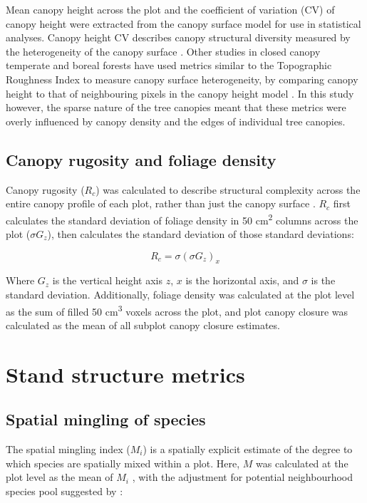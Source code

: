 \documentclass[11pt,a4paper]{article}
\begin{document}
Mean canopy height across the plot and the coefficient of variation (CV) of canopy height were extracted from the canopy surface model for use in statistical analyses. Canopy height CV describes canopy structural diversity measured by the heterogeneity of the canopy surface \citep{Parker2004}. Other studies in closed canopy temperate and boreal forests have used metrics similar to the Topographic Roughness Index to measure canopy surface heterogeneity, by comparing canopy height to that of neighbouring pixels in the canopy height model \citep{Weligepolage2012, HerreroHuerta2020}. In this study however, the sparse nature of the tree canopies meant that these metrics were overly influenced by canopy density and the edges of individual tree canopies. 

\subsection{Canopy rugosity and foliage density}

Canopy rugosity ($R_{c}$) was calculated to describe structural complexity across the entire canopy profile of each plot, rather than just the canopy surface \citep{Hardiman2011}. $R_{c}$ first calculates the standard deviation of foliage density in 50 cm\textsuperscript{2} columns across the plot ($\sigma{}G_{z}$), then calculates the standard deviation of those standard deviations: 

\begin{equation}
	R_{c} = \sigma{}(\sigma{}G_{z})_{x}
\end{equation}

Where $G_{z}$ is the vertical height axis $z$, $x$ is the horizontal axis, and $\sigma{}$ is the standard deviation. Additionally, foliage density was calculated at the plot level as the sum of filled 50 cm\textsuperscript{3} voxels across the plot, and plot canopy closure was calculated as the mean of all subplot canopy closure estimates. 

\section{Stand structure metrics}

\subsection{Spatial mingling of species}

The spatial mingling index ($M_{i}$) is a spatially explicit estimate of the degree to which species are spatially mixed within a plot. Here, $M$ was calculated at the plot level as the mean of $M_{i}$ \citep{Gadow2002}, with the adjustment for potential neighbourhood species pool suggested by \citet{Hui2011}: 
\end{document}
